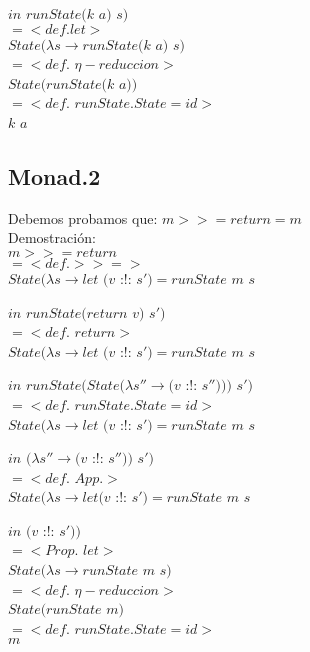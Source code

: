\documentclass[12pt, titlepage]{article}
\begin{document}
\hspace{45pt} $in$ $runState (k$ $a)$ $s)$\\
$=<def. let>$\\
$State (\lambda s \rightarrow runState (k$ $a)$ $s)$\\
$= <def.$ $\eta - reduccion>$\\
$State(runState (k$ $a))$\\
$= <def.$ $runState.State = id>$\\
$k$ $a$

\newpage
\subsection*{Monad.2}
Debemos probamos que: $m >>= return = m$\\
Demostración:\\
$m >>= return$\\
$= <def. >>=>$\\
$State (\lambda s \rightarrow  let$ $(v$ :!: $s') = runState$ $m$ $s$

\hspace{45pt} $in$ $runState (return$ $v)$ $s')$\\
$=<def.$ $return>$\\
$State (\lambda s \rightarrow  let$ $(v$ :!: $s') = runState$ $m$ $s$

\hspace{45pt} $in$ $runState (State (\lambda s'' \rightarrow(v$ :!: $s'')))$ $s')$\\
$=<def.$ $runState.State = id>$\\
$State (\lambda s \rightarrow  let$ $(v$ :!: $s') = runState$ $m$ $s$
 	    
\hspace{45pt}$in$ $(\lambda s'' \rightarrow (v$ :!: $s''))$ $s')$\\
$=<def.$ $App.>$\\
$State (\lambda s \rightarrow  let$$(v$ :!: $s') = runState$ $m$ $s$
 	   
\hspace{43pt} $in$ $(v$ :!: $s'))$\\
$=<Prop.$ $let>$\\
$State (\lambda s \rightarrow  runState$ $m$ $s)$\\
$=<def.$ $\eta - reduccion>$\\
$State (runState$ $m)$\\
$=<def.$ $runState.State = id>$\\
$m$
\end{document}
